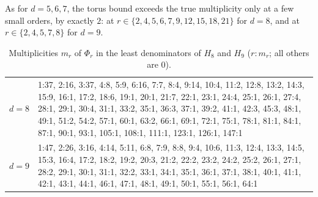 {As for $d=5,6,7$, the torus bound exceeds the true multiplicity only at a few small orders, by exactly $2$: at $r\in\{2,4,5,6,7,9,12,15,18,21\}$ for $d=8$, and at $r\in\{2,4,5,7,8\}$ for $d=9$.

\begin{table}[h]\small
\caption{Multiplicities $m_r$ of $\Phi_r$ in the least denominators of $H_8$ and $H_9$ ($r{:}m_r$; all others are $0$).}\label{tab:oct}
\begin{tabular}{@{}p{}p{}@{}}
\toprule
$d=8$ & 1:37, 2:16, 3:37, 4:8, 5:9, 6:16, 7:7, 8:4, 9:14, 10:4, 11:2, 12:8, 13:2, 14:3, 15:9, 16:1, 17:2, 18:6, 19:1, 20:1, 21:7, 22:1, 23:1, 24:4, 25:1, 26:1, 27:4, 28:1, 29:1, 30:4, 31:1, 33:2, 35:1, 36:3, 37:1, 39:2, 41:1, 42:3, 45:3, 48:1, 49:1, 51:2, 54:2, 57:1, 60:1, 63:2, 66:1, 69:1, 72:1, 75:1, 78:1, 81:1, 84:1, 87:1, 90:1, 93:1, 105:1, 108:1, 111:1, 123:1, 126:1, 147:1\\[3pt]
$d=9$ & 1:47, 2:26, 3:16, 4:14, 5:11, 6:8, 7:9, 8:8, 9:4, 10:6, 11:3, 12:4, 13:3, 14:5, 15:3, 16:4, 17:2, 18:2, 19:2, 20:3, 21:2, 22:2, 23:2, 24:2, 25:2, 26:1, 27:1, 28:2, 29:1, 30:1, 31:1, 32:2, 33:1, 34:1, 35:1, 36:1, 37:1, 38:1, 40:1, 41:1, 42:1, 43:1, 44:1, 46:1, 47:1, 48:1, 49:1, 50:1, 55:1, 56:1, 64:1\\
\bottomrule
\end{tabular}
\end{table}}
\newcommand{\OCTICCHECKROWS}{Torus bounds $b_r$, $d=8,9$, recomputed blind & identical\\
Method re-derives Bedratyuk--Xin's $H_5$ and $H_6$ from fresh grid data & exact, equal\\
$H_8$: exact $a_n$, $n\le1194$ (six $62$-bit primes); determination; pole order $37$ & passes\\
$H_8$: prediction modulo a $31$-bit prime, $n\le1600$ & mod $p$, agrees\\
$H_8$: independent weight counting modulo $65521$ and $65519$, $n\le450$ & mod $p$, agrees\\
$H_9$: exact $a_n$, $n\le686$; determination; pole order $47$ & passes\\
$H_9$: prediction modulo a $31$-bit prime, $n\le1000$; weight counting, $n\le400$ & mod $p$, agrees\\}
\newcommand{\OCTICLIMIT}{exact grid coefficients modulo six $62$-bit primes, checked out of sample and against independent weight counting}
